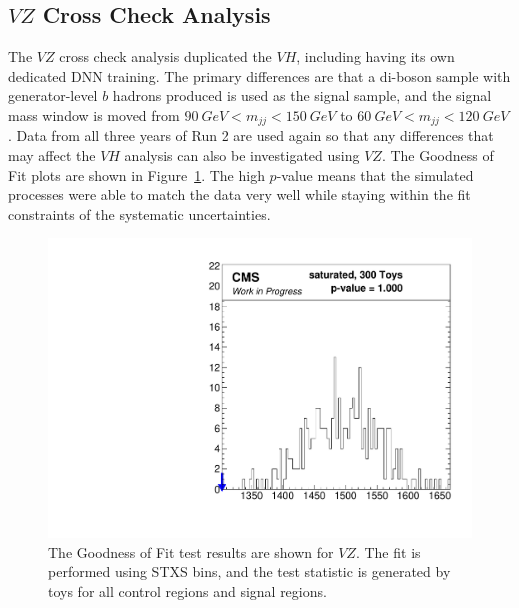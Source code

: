 \subsection{$V\!Z$ Cross Check Analysis}

The $V\!Z$ cross check analysis duplicated the $V\!H$, including
having its own dedicated DNN training. 
The primary differences are that a di-boson sample with generator-level $b$ hadrons produced
is used as the signal sample, and the signal mass window is moved from $\SI{90}{GeV} < m_{jj} < \SI{150}{GeV}$
to  $\SI{60}{GeV} < m_{jj} < \SI{120}{GeV}$.
Data from all three years of Run 2 are used again so that any differences that may affect the $V\!H$ analysis
can also be investigated using $V\!Z$.
The Goodness of Fit plots are shown in
Figure~\ref{fig:vz-gof}. 
The high $p$-value means that the simulated processes were able to match the data very well
while staying within the fit constraints of the systematic
uncertainties.  

\begin{figure}
  \centering
  \includegraphics[width=0.65\linewidth]{figures/210308_STXS_VZ_XbbVZ_e4179c95_inclusive_gof/Gof_inclusive_.pdf}
  \caption[Goodness of Fit for $V\!Z$]{
    The Goodness of Fit test results are shown for $V\!Z$.
    The fit is performed using STXS bins,
    and the test statistic is generated by toys for all control regions and signal regions.
  }
  \label{fig:vz-gof}
\end{figure}

